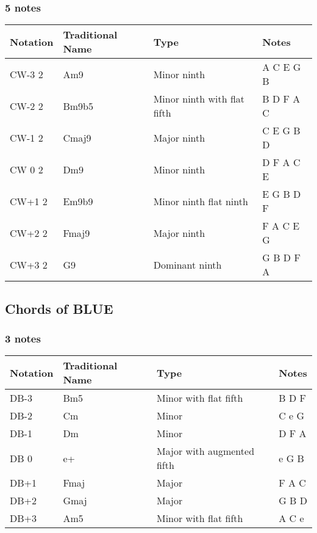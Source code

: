 \documentclass[]{report}
\begin{document}
\subsubsection*{5 notes}
\begin{table}[H]
\centering
\begin{tabularx}{\textwidth}{ll>{\raggedright\arraybackslash}Xl}
\toprule
Notation & Traditional Name & Type & Notes \\
\midrule
\textsf{CW-3} 2 & Am9 & Minor ninth & A C E G B \\
\textsf{CW-2} 2 & Bm9b5 & Minor ninth with flat fifth & B D F A C \\
\textsf{CW-1} 2 & Cmaj9 & Major ninth & C E G B D \\
\textsf{CW 0} 2 & Dm9 & Minor ninth & D F A C E \\
\textsf{CW+1} 2 & Em9b9 & Minor ninth flat ninth & E G B D F \\
\textsf{CW+2} 2 & Fmaj9 & Major ninth & F A C E G \\
\textsf{CW+3} 2 & G9 & Dominant ninth & G B D F A \\
\bottomrule
\end{tabularx}
\end{table}
\subsection*{Chords of BLUE}
\subsubsection*{3 notes}
\begin{table}[H]
\centering
\begin{tabularx}{\textwidth}{ll>{\raggedright\arraybackslash}Xl}
\toprule
Notation & Traditional Name & Type & Notes \\
\midrule
\textsf{DB-3} & Bm5 & Minor with flat fifth & B D F \\
\textsf{DB-2} & Cm & Minor & C e G \\
\textsf{DB-1} & Dm & Minor & D F A \\
\textsf{DB 0} & e+ & Major with augmented fifth & e G B \\
\textsf{DB+1} & Fmaj & Major & F A C \\
\textsf{DB+2} & Gmaj & Major & G B D \\
\textsf{DB+3} & Am5 & Minor with flat fifth & A C e \\
\bottomrule
\end{tabularx}
\end{table}
\end{document}
